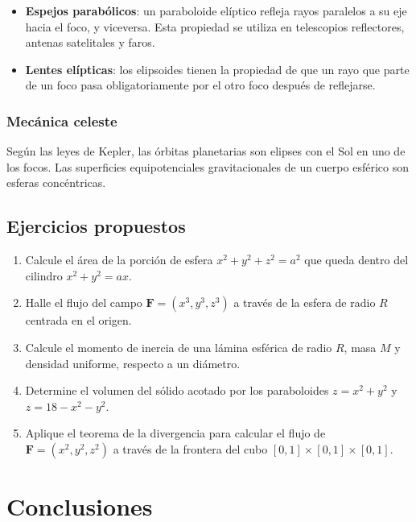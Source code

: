 \documentclass[
]{book}
\providecommand{\tightlist}{%
  \setlength{\itemsep}{0pt}\setlength{\parskip}{0pt}}
\begin{document}
\begin{itemize}
\tightlist
\item
  \textbf{Espejos parabólicos}: un paraboloide elíptico refleja rayos paralelos a su eje hacia el foco, y viceversa. Esta propiedad se utiliza en telescopios reflectores, antenas satelitales y faros.
\item
  \textbf{Lentes elípticas}: los elipsoides tienen la propiedad de que un rayo que parte de un foco pasa obligatoriamente por el otro foco después de reflejarse.
\end{itemize}

\subsection{Mecánica celeste}\label{mecuxe1nica-celeste}

Según las leyes de Kepler, las órbitas planetarias son elipses con el Sol en uno de los focos. Las superficies equipotenciales gravitacionales de un cuerpo esférico son esferas concéntricas.

\section{Ejercicios propuestos}\label{ejercicios-propuestos-7}

\begin{enumerate}
\def\labelenumi{\arabic{enumi}.}
\tightlist
\item
  Calcule el área de la porción de esfera \(x^2 + y^2 + z^2 = a^2\) que queda dentro del cilindro \(x^2 + y^2 = ax\).
\item
  Halle el flujo del campo \(\mathbf{F} = (x^3, y^3, z^3)\) a través de la esfera de radio \(R\) centrada en el origen.
\item
  Calcule el momento de inercia de una lámina esférica de radio \(R\), masa \(M\) y densidad uniforme, respecto a un diámetro.
\item
  Determine el volumen del sólido acotado por los paraboloides \(z = x^2 + y^2\) y \(z = 18 - x^2 - y^2\).
\item
  Aplique el teorema de la divergencia para calcular el flujo de \(\mathbf{F} = (x^2, y^2, z^2)\) a través de la frontera del cubo \([0, 1] \times [0, 1] \times [0, 1]\).
\end{enumerate}

\chapter{Conclusiones}\label{conclusiones}
\end{document}
